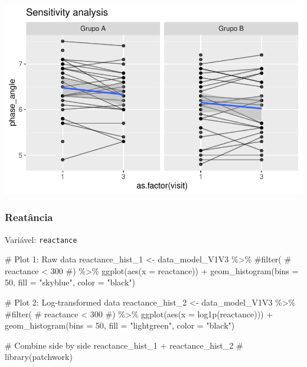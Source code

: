 \documentclass[
  letterpaper,
  DIV=11,
  numbers=noendperiod]{scrartcl}
\newenvironment{Shaded}{\begin{snugshade}}{\end{snugshade}}
\newcommand{\AttributeTok}[1]{\textcolor[rgb]{0.40,0.45,0.13}{#1}}
\newcommand{\CommentTok}[1]{\textcolor[rgb]{0.37,0.37,0.37}{#1}}
\newcommand{\DecValTok}[1]{\textcolor[rgb]{0.68,0.00,0.00}{#1}}
\newcommand{\FunctionTok}[1]{\textcolor[rgb]{0.28,0.35,0.67}{#1}}
\newcommand{\NormalTok}[1]{\textcolor[rgb]{0.00,0.23,0.31}{#1}}
\newcommand{\OtherTok}[1]{\textcolor[rgb]{0.00,0.23,0.31}{#1}}
\newcommand{\SpecialCharTok}[1]{\textcolor[rgb]{0.37,0.37,0.37}{#1}}
\newcommand{\StringTok}[1]{\textcolor[rgb]{0.13,0.47,0.30}{#1}}
\begin{document}
\includegraphics{Outcomes_V1V2V3_files/figure-pdf/phase_angle_6-2.pdf}

\subsubsection{Reatância}\label{reatuxe2ncia}

Variável: \texttt{reactance}

\begin{Shaded}
\begin{Highlighting}[]
\CommentTok{\# Plot 1: Raw data}
\NormalTok{reactance\_hist\_1 }\OtherTok{\textless{}{-}}\NormalTok{ data\_model\_V1V3 }\SpecialCharTok{\%\textgreater{}\%} 
    \CommentTok{\#filter(}
    \CommentTok{\#    reactance \textless{} 300}
    \CommentTok{\#) \%\textgreater{}\% }
    \FunctionTok{ggplot}\NormalTok{(}\FunctionTok{aes}\NormalTok{(}\AttributeTok{x =}\NormalTok{ reactance)) }\SpecialCharTok{+} 
    \FunctionTok{geom\_histogram}\NormalTok{(}\AttributeTok{bins =} \DecValTok{50}\NormalTok{, }\AttributeTok{fill =} \StringTok{"skyblue"}\NormalTok{, }\AttributeTok{color =} \StringTok{"black"}\NormalTok{)}

\CommentTok{\# Plot 2: Log{-}transformed data}
\NormalTok{reactance\_hist\_2 }\OtherTok{\textless{}{-}}\NormalTok{ data\_model\_V1V3 }\SpecialCharTok{\%\textgreater{}\%} 
    \CommentTok{\#filter(}
    \CommentTok{\#    reactance \textless{} 300}
    \CommentTok{\#) \%\textgreater{}\%}
    \FunctionTok{ggplot}\NormalTok{(}\FunctionTok{aes}\NormalTok{(}\AttributeTok{x =} \FunctionTok{log1p}\NormalTok{(reactance))) }\SpecialCharTok{+} 
    \FunctionTok{geom\_histogram}\NormalTok{(}\AttributeTok{bins =} \DecValTok{50}\NormalTok{, }\AttributeTok{fill =} \StringTok{"lightgreen"}\NormalTok{, }\AttributeTok{color =} \StringTok{"black"}\NormalTok{)}

\CommentTok{\# Combine side by side}
\NormalTok{reactance\_hist\_1 }\SpecialCharTok{+}\NormalTok{ reactance\_hist\_2 }\CommentTok{\# library(patchwork)}
\end{Highlighting}
\end{Shaded}
\end{document}
